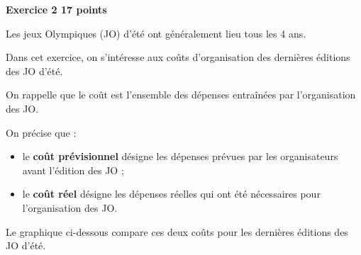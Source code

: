 \documentclass[11pt]{article}
\begin{document}
\bigskip

\textbf{\large{}Exercice 2 \hfill 17 points}

\medskip

Les jeux Olympiques (JO) d'été ont généralement lieu tous les 4 ans.

Dans cet exercice, on s'intéresse aux coûts d'organisation des dernières éditions des JO d'été.

On rappelle que le coût est l'ensemble des dépenses entraînées par l'organisation des JO.

On précise que :

\begin{itemize}
\item le \textbf{coût prévisionnel} désigne les dépenses prévues par les organisateurs avant l'édition des JO ;
\item le \textbf{coût réel} désigne les dépenses réelles qui ont été nécessaires pour l'organisation des JO.
\end{itemize}

Le graphique ci-dessous compare ces deux coûts pour les dernières éditions des JO d'été.

\medskip
\end{document}
